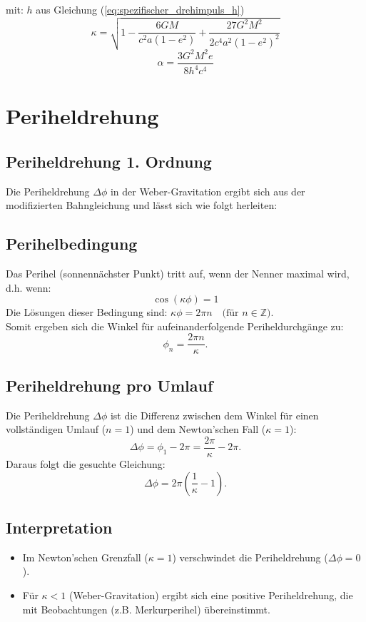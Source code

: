 mit:
$h$ aus Gleichung (\ref{eq:spezifischer_drehimpuls_h})
\begin{equation}
\label{eq:kappa_2_ordnung}
\boxed
{
    \kappa = \sqrt{1 - \frac{6GM}{c^2a(1-e^2)} + \frac{27G^2M^2}{2c^4a^2(1-e^2)^2}}
}
\end{equation}
\begin{equation}
\label{eq:alpha}
\boxed
{
    \alpha = \frac{3G^2M^2e}{8h^4c^4}    
}
\end{equation}

\newpage
\section{Periheldrehung}
\subsection{Periheldrehung 1. Ordnung}
Die Periheldrehung $\Delta\phi$ in der Weber-Gravitation ergibt sich aus der modifizierten Bahngleichung und lässt sich wie folgt herleiten:

\subsection*{Perihelbedingung}
Das Perihel (sonnennächster Punkt) tritt auf, wenn der Nenner maximal wird, d.h. wenn:\\
\[\cos(\kappa\phi) = 1\]
Die Lösungen dieser Bedingung sind: $\kappa\phi = 2\pi n \quad \text{(für $n \in \mathbb{Z}$)}$.\\

Somit ergeben sich die Winkel für aufeinanderfolgende Periheldurchgänge zu:
\[
    \phi_n = \frac{2\pi n}{\kappa}.
\]

\subsection*{Periheldrehung pro Umlauf}
Die Periheldrehung $\Delta\phi$ ist die Differenz zwischen dem Winkel für einen vollständigen Umlauf ($n = 1$) und dem Newton'schen Fall ($\kappa = 1$):
\[
    \Delta\phi = \phi_1 - 2\pi = \frac{2\pi}{\kappa} - 2\pi.
\]
Daraus folgt die gesuchte Gleichung:
\begin{equation}
\boxed
{
    \Delta\phi = 2\pi\left(\frac{1}{\kappa} - 1\right)
}.
\end{equation}

\subsection*{Interpretation}
\begin{itemize}
\item Im Newton'schen Grenzfall ($\kappa = 1$) verschwindet die Periheldrehung ($\Delta\phi = 0$).
\item Für $\kappa < 1$ (Weber-Gravitation) ergibt sich eine positive Periheldrehung, die mit Beobachtungen (z.B. Merkurperihel) übereinstimmt.
\end{itemize}

